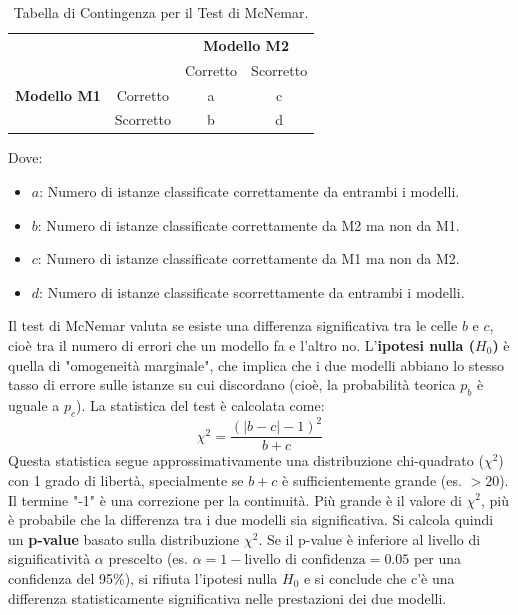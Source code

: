 \documentclass{article}
\begin{document}
\begin{table}[H]
    \centering
    \caption{Tabella di Contingenza per il Test di McNemar.}
    \label{tab:mcnemar_contingency}
    \begin{tabular}{cc|cc}
                            &           & \multicolumn{2}{c}{\textbf{Modello M2}}             \\
                            &           & Corretto                                & Scorretto \\
        \hline
        \textbf{Modello M1} & Corretto  & a                                       & c         \\
                            & Scorretto & b                                       & d         \\
    \end{tabular}
\end{table}
Dove:
\begin{itemize}
    \item $a$: Numero di istanze classificate correttamente da entrambi i modelli.
    \item $b$: Numero di istanze classificate correttamente da M2 ma non da M1.
    \item $c$: Numero di istanze classificate correttamente da M1 ma non da M2.
    \item $d$: Numero di istanze classificate scorrettamente da entrambi i modelli.
\end{itemize}
Il test di McNemar valuta se esiste una differenza significativa tra le celle $b$ e $c$, cioè tra il numero di errori che un modello fa e l'altro no.
L'\textbf{ipotesi nulla ($H_0$)} è quella di "omogeneità marginale", che implica che i due modelli abbiano lo stesso tasso di errore sulle istanze su cui discordano (cioè, la probabilità teorica $p_b$ è uguale a $p_c$).
La statistica del test è calcolata come:
$$ \chi^2 = \frac{(|b-c|-1)^2}{b+c} $$
Questa statistica segue approssimativamente una distribuzione chi-quadrato ($\chi^2$) con 1 grado di libertà, specialmente se $b+c$ è sufficientemente grande (es. $>20$). Il termine "-1" è una correzione per la continuità.
Più grande è il valore di $\chi^2$, più è probabile che la differenza tra i due modelli sia significativa.  Si calcola quindi un \textbf{p-value} basato sulla distribuzione $\chi^2$. Se il p-value è inferiore al livello di significatività $\alpha$ prescelto (es. $\alpha = 1 - \text{livello di confidenza} = 0.05$ per una confidenza del 95\%), si rifiuta l'ipotesi nulla $H_0$ e si conclude che c'è una differenza statisticamente significativa nelle prestazioni dei due modelli.
\end{document}
